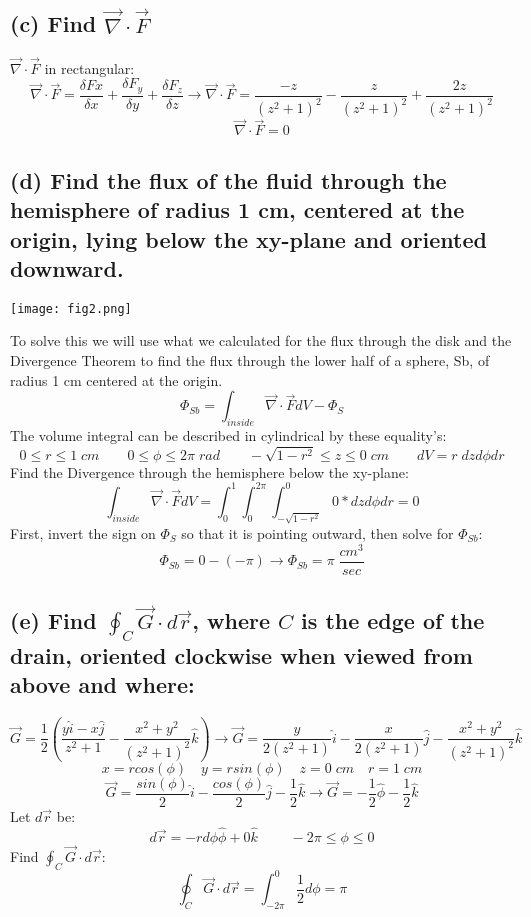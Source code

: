 \documentclass[11pt]{article}
\begin{document}
\subsection*{(c) Find $\vec{\nabla}\cdot\vec{F}$}
$\vec{\nabla}\cdot\vec{F}$ in rectangular:
$$\vec{\nabla}\cdot\vec{F} = \frac{\delta Fx}{\delta x} + \frac{\delta F_y}{\delta y} + \frac{\delta F_z}{\delta z} \rightarrow \vec{\nabla}\cdot\vec{F} = \frac{-z}{(z^2+1)^2} - \frac{z}{(z^2+1)^2} + \frac{2z}{(z^2+1)^2}$$
$$\vec{\nabla}\cdot\vec{F} = 0$$

\subsection*{(d) Find the flux of the fluid through the hemisphere of radius 1 cm, centered at the origin, lying below the xy-plane and oriented downward.}
\begin{center}
    \texttt{[image: fig2.png]}
\end{center}
To solve this we will use what we calculated for the flux through the disk and the Divergence Theorem to find the flux through the lower half of a sphere, Sb, of radius 1 cm centered at the origin.
$$\Phi_{Sb} = \int_{inside}\vec{\nabla}\cdot\vec{F}dV - \Phi_S$$
The volume integral can be described in cylindrical by these equality's:
$$0 \leq r \leq 1 \;cm \qquad 0 \leq \phi \leq 2\pi \; rad \qquad -\sqrt{1-r^2} \leq z \leq 0 \; cm\qquad dV = r\;dzd\phi dr$$
Find the Divergence through the hemisphere below the xy-plane:
$$\int_{inside}\vec{\nabla}\cdot\vec{F}dV = \int_0^1\int_0^{2\pi}\int_{-\sqrt{1-r^2}}^0  0*dzd\phi dr = 0$$
First, invert the sign on $\Phi_S$ so that it is pointing outward, then solve for $\Phi_{Sb}$:
$$\Phi_{Sb} =0- (-\pi) \rightarrow \Phi_{Sb} = \pi \;\frac{cm^3}{sec}$$

\subsection*{(e) Find $\oint_C \vec{G} \cdot d\vec{r}$, where $C$ is the edge of the drain, oriented clockwise when viewed from above and where:}
$$\vec{G} = \frac{1}{2}\left( \frac{y\hat{i}-x\hat{j}}{z^2+1}-\frac{x^2+y^2}{(z^2+1)^2}\hat{k}\right) \rightarrow \vec{G} = \frac{y}{2(z^2+1)}\hat{i} - \frac{x}{2(z^2+1)}\hat{j} - \frac{x^2+y^2}{(z^2+1)^2}\hat{k}$$ 
$$x = r cos(\phi) \quad y = r sin(\phi) \quad z = 0\; cm\quad r = 1 \;cm$$
$$\vec{G} = \frac{sin(\phi)}{2}\hat{i}-\frac{cos(\phi)}{2}\hat{j}-\frac{1}{2}\hat{k} \rightarrow \vec{G} = -\frac{1}{2}\hat{\phi} -\frac{1}{2}\hat{k}$$
Let $d\vec{r}$ be: 
$$ d\vec{r} = -rd\phi \hat{\phi} + 0 \hat{k}\; \qquad -2\pi \leq \phi \leq 0$$
Find  $\oint_C \vec{G} \cdot d\vec{r}$:
 $$\oint_C \vec{G} \cdot d\vec{r} = \int_{-2\pi}^0\frac{1}{2}d\phi = \pi$$
\end{document}
